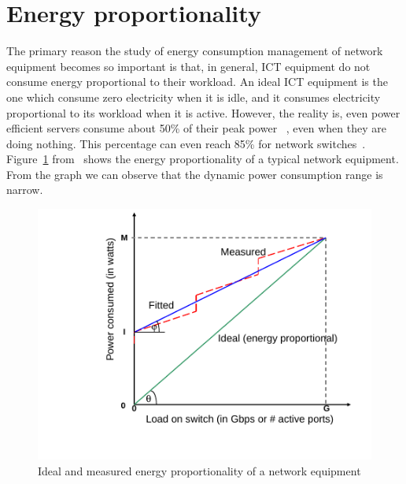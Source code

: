 \section{Energy proportionality}
\label{section:energyproportionality}
The primary reason the study of energy consumption management of network equipment becomes so important is that, in general, ICT equipment do not consume energy proportional to their workload. An ideal ICT equipment is the one which consume zero electricity when it is idle, and it consumes electricity proportional to its workload when it is active. However, the reality is, even power efficient servers consume about 50\% of their peak power ~\cite{DBLP:journals/computer/BarrosoH07}, even when they are doing nothing. This percentage can even reach 85\% for network switches~\cite{DBLP:conf/IEEEcloud/FiandrinoKBZ15}. Figure~\ref{fig:energyproportionality} from~\cite{DBLP:conf/networking/MahadevanSBR09} shows the energy proportionality of a typical network equipment. From the graph we can observe that the dynamic power consumption range is narrow.
\begin{figure}[htb]
	\begin{center}
		\includegraphics[width=13cm]{images/energyproportionality.pdf}
		\vspace*{-1.0cm}
		\caption{Ideal and measured energy proportionality of a network equipment~\cite{DBLP:conf/networking/MahadevanSBR09}}
		\label{fig:energyproportionality}
	\end{center}
\end{figure}

